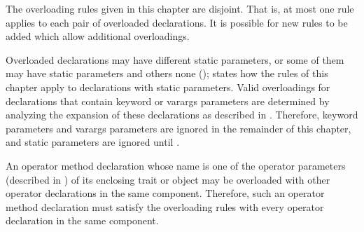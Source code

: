 The overloading rules given in this chapter are disjoint.  That is, at
most one rule applies to each pair of overloaded declarations.  It is
possible for new rules to be added which allow additional
overloadings.

\label{adv-over-kwd}
Overloaded declarations may have different static parameters, or some of them
may have static parameters and others none ();
 states how the rules of this chapter apply
to declarations with static parameters.  Valid overloadings for
declarations that contain keyword or
varargs parameters are determined
by analyzing the expansion of these declarations as described in
.  Therefore, keyword
parameters and varargs parameters are ignored in
the remainder of this chapter, and static parameters are ignored until
.

An operator method declaration whose name is one of the operator parameters
(described in )
of its enclosing trait or object may be overloaded with other operator
declarations in the same component.  Therefore, such an operator method
declaration must satisfy the overloading rules
with every operator declaration in the same component.



